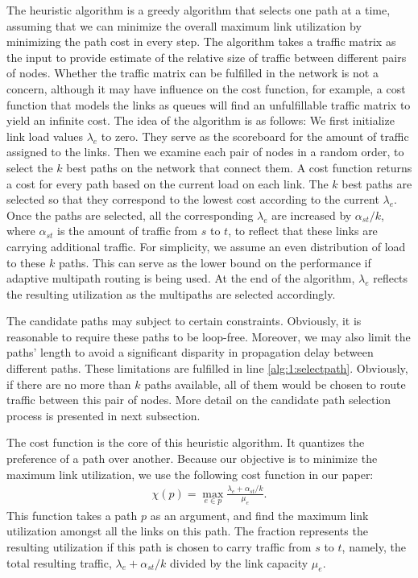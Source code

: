 \documentclass[conference]{IEEEtran}
\begin{document}
The heuristic algorithm is a greedy algorithm that selects one path at a time,
assuming that we can minimize the overall maximum link utilization by
minimizing the path cost in every step. The algorithm takes a traffic matrix as
the input to provide estimate of the relative size of traffic between different
pairs of nodes. Whether the traffic matrix can be fulfilled in the network is
not a concern, although it may have influence on the cost function, for example, a
cost function that models the links as queues will find an unfulfillable
traffic matrix to yield an infinite cost. The idea of the algorithm is as
follows: We first initialize link load values $\lambda_e$ to zero. They serve
as the scoreboard for the amount of traffic assigned to the links. Then we
examine each pair of nodes in a random order, to select the $k$ best paths on
the network that connect them. A cost function returns a cost for every path
based on the current load on each link. The $k$ best paths are selected so that
they correspond to the lowest cost according to the current $\lambda_e$. Once
the paths are selected, all the corresponding $\lambda_e$ are increased by
$\alpha_{st}/k$, where $\alpha_{st}$ is the amount of traffic from $s$ to $t$,
to reflect that these links are carrying additional traffic. For simplicity, we
assume an even distribution of load to these $k$ paths. This can serve as the
lower bound on the performance if adaptive multipath routing is being used. At
the end of the algorithm, $\lambda_e$ reflects the resulting utilization as the
multipaths are selected accordingly.

The candidate paths may subject to certain constraints. Obviously, it is
reasonable to require these paths to be loop-free. Moreover, we may also limit
the paths' length to avoid a significant disparity in propagation delay between
different paths. These limitations are fulfilled in line
\ref{alg:1:selectpath}. Obviously, if there are no more than $k$ paths
available, all of them would be chosen to route traffic between this pair of
nodes. More detail on the candidate path selection process is presented in next
subsection.

The cost function is the core of this heuristic algorithm. It quantizes the
preference of a path over another. Because our objective is to minimize the
maximum link utilization, we use the following cost function in our paper:
\begin{align}
\chi(p) = \max_{e\in p} \frac{\lambda_e + \alpha_{st}/k}{\mu_e}.
\label{maxfunction}
\end{align}
This function takes a path $p$ as an argument, and find the maximum link
utilization amongst all the links on this path. The fraction represents the
resulting utilization if this path is chosen to carry traffic from $s$ to $t$,
namely, the total resulting traffic, $\lambda_e+\alpha_{st}/k$ divided by the
link capacity $\mu_e$.
\end{document}
